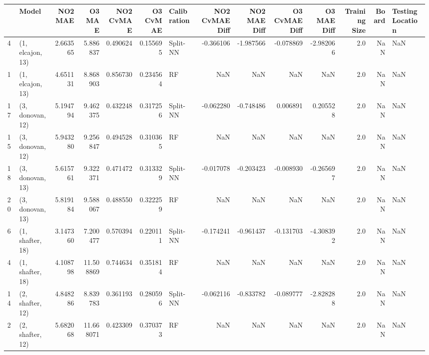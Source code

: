 \begin{tabular}{llrrrrlrrrrrrl}
\toprule
{} &             Model &    NO2 MAE &     O3 MAE &  NO2 CvMAE &  O3 CvMAE & Calibration &  NO2 CvMAE Diff &  NO2 MAE Diff &  O3 CvMAE Diff &  O3 MAE Diff &  Training Size &  Board & Testing Location \\
\midrule
4  &  (1, elcajon, 13) &   2.663565 &   5.886837 &   0.490624 &  0.155695 &    Split-NN &       -0.366106 &     -1.987566 &      -0.078869 &    -2.982066 &            2.0 &    NaN &              NaN \\
1  &  (1, elcajon, 13) &   4.651131 &   8.868903 &   0.856730 &  0.234564 &          RF &             NaN &           NaN &            NaN &          NaN &            2.0 &    NaN &              NaN \\
17 &  (3, donovan, 12) &   5.194794 &   9.462375 &   0.432248 &  0.317256 &    Split-NN &       -0.062280 &     -0.748486 &       0.006891 &     0.205528 &            2.0 &    NaN &              NaN \\
15 &  (3, donovan, 12) &   5.943280 &   9.256847 &   0.494528 &  0.310365 &          RF &             NaN &           NaN &            NaN &          NaN &            2.0 &    NaN &              NaN \\
18 &  (3, donovan, 13) &   5.615761 &   9.322371 &   0.471472 &  0.313329 &    Split-NN &       -0.017078 &     -0.203423 &      -0.008930 &    -0.265697 &            2.0 &    NaN &              NaN \\
20 &  (3, donovan, 13) &   5.819184 &   9.588067 &   0.488550 &  0.322259 &          RF &             NaN &           NaN &            NaN &          NaN &            2.0 &    NaN &              NaN \\
6  &  (1, shafter, 18) &   3.147360 &   7.200477 &   0.570394 &  0.220111 &    Split-NN &       -0.174241 &     -0.961437 &      -0.131703 &    -4.308392 &            2.0 &    NaN &              NaN \\
4  &  (1, shafter, 18) &   4.108798 &  11.508869 &   0.744634 &  0.351814 &          RF &             NaN &           NaN &            NaN &          NaN &            2.0 &    NaN &              NaN \\
14 &  (2, shafter, 12) &   4.848286 &   8.839783 &   0.361193 &  0.280596 &    Split-NN &       -0.062116 &     -0.833782 &      -0.089777 &    -2.828288 &            2.0 &    NaN &              NaN \\
2  &  (2, shafter, 12) &   5.682068 &  11.668071 &   0.423309 &  0.370373 &          RF &             NaN &           NaN &            NaN &          NaN &            2.0 &    NaN &              NaN \\

\end{tabular}
